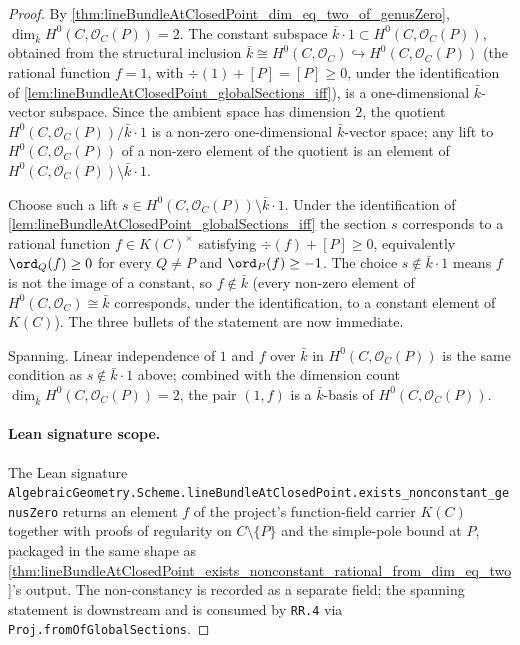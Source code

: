 \begin{proof}
  
  
  
  By
  \cref{thm:lineBundleAtClosedPoint_dim_eq_two_of_genusZero},
  \(\dim_{\bar k} H^0(C, \mathcal O_C(P)) = 2\). The constant subspace
  \(\bar k \cdot 1 \subset H^0(C, \mathcal O_C(P))\), obtained from the
  structural inclusion $\bar k \cong H^0(C, \mathcal O_C)
  \hookrightarrow H^0(C, \mathcal O_C(P))$ (the rational function
  \(f = 1\), with \(\div(1) + [P] = [P] \geq 0\), under the
  identification of
  \cref{lem:lineBundleAtClosedPoint_globalSections_iff}), is a one-dimensional
  \(\bar k\)-vector subspace. Since the ambient space has dimension \(2\),
  the quotient \(H^0(C, \mathcal O_C(P)) / \bar k \cdot 1\) is a
  non-zero one-dimensional \(\bar k\)-vector space; any lift to
  \(H^0(C, \mathcal O_C(P))\) of a non-zero element of the quotient is
  an element of \(H^0(C, \mathcal O_C(P)) \setminus \bar k \cdot 1\).

  Choose such a lift $s \in H^0(C, \mathcal O_C(P)) \setminus \bar k
  \cdot 1$. Under the identification of
  \cref{lem:lineBundleAtClosedPoint_globalSections_iff} the section
  \(s\) corresponds to a rational function \(f \in K(C)^{\times}\)
  satisfying \(\div(f) + [P] \geq 0\), equivalently \(\ord_Q(f) \geq 0\)
  for every \(Q \neq P\) and \(\ord_P(f) \geq -1\). The choice
  \(s \notin \bar k \cdot 1\) means \(f\) is not the image of a constant,
  so \(f \notin \bar k\) (every non-zero element of
  \(H^0(C, \mathcal O_C) \cong \bar k\) corresponds, under the
  identification, to a constant element of \(K(C)\)). The three bullets
  of the statement are now immediate.

  Spanning. Linear independence of \(1\) and \(f\) over \(\bar k\) in
  \(H^0(C, \mathcal O_C(P))\) is the same condition as
  \(s \notin \bar k \cdot 1\) above; combined with the dimension count
  \(\dim_{\bar k} H^0(C, \mathcal O_C(P)) = 2\), the pair \((1, f)\) is a
  \(\bar k\)-basis of \(H^0(C, \mathcal O_C(P))\).

  \paragraph{Lean signature scope.} The Lean signature
  \texttt{AlgebraicGeometry.Scheme.lineBundleAtClosedPoint.exists\_nonconstant\_genusZero}
  returns an element \(f\) of the project's function-field carrier
  \(K(C)\) together with proofs of regularity on \(C \setminus \{P\}\) and
  the simple-pole bound at \(P\), packaged in the same shape as
  \cref{thm:lineBundleAtClosedPoint_exists_nonconstant_rational_from_dim_eq_two}'s output. The
  non-constancy is recorded as a separate field; the spanning
  statement is downstream and is consumed by \texttt{RR.4} via
  \texttt{Proj.fromOfGlobalSections}.
\end{proof}

